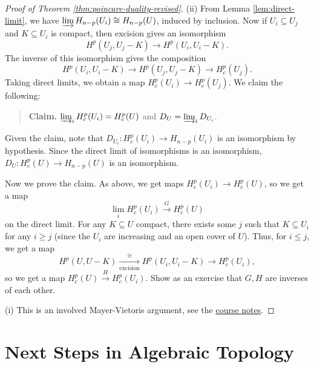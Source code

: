 \begin{proof}[Proof of Theorem \ref{thm:poincare-duality-revised}]
  (ii) From Lemma \ref{lem:direct-limit},
  we have $\varinjlim H_{n - p}(U_i) \cong H_{n - p}(U)$, induced by inclusion.
  Now if $U_i \subseteq U_j$ and
  $K \subseteq U_i$ is compact, then
  excision gives an isomorphism
  \[H^p(U_j, U_j - K) \longrightarrow H^p(U_i, U_i - K).\]
  The inverse of this isomorphism
  gives the composition
  \[
    H^p(U_i, U_i - K) \longrightarrow H^p(U_j, U_j - K) \longrightarrow H^p_c(U_j).
  \]
  Taking direct limits, we obtain a map
  $H^p_c(U_i) \to H^p_c(U_j)$. We claim
  the following:
  \begin{quote}
    \textbf{Claim.}
      $\varinjlim_i H^p_c(U_i) = H^p_c(U)$
      and $D_U = \varinjlim_i D_{U_i}$.
  \end{quote}
  Given the claim, note that
  $D_{U_i} : H^p_c(U_i) \to H_{n - p}(U_i)$
  is an isomorphism by hypothesis. Since
  the direct limit of isomorphisms is
  an isomorphism, $D_U : H^p_c(U) \to H_{n - p}(U)$
  is an isomorphism.

  Now we prove the claim. As above, we get
  maps $H^p_c(U_i) \to H^p_c(U)$, so we
  get a map
  \[
    \lim_i H^p_c(U_i) \overset{G}\longrightarrow H^p_c(U)
  \]
  on the direct limit. For any
  $K \subseteq U$ compact, there exists
  some $j$ such that $K \subseteq U_i$
  for any $i \ge j$ (since the $U_i$ are
  increasing and an open cover of $U$).
  Thus, for $i \le j$, we get a map
  \[
    H^p(U, U - K) \underset{\text{excision}}{\overset{\cong}{\longrightarrow}} H^p(U_i, U_i - K)
    \longrightarrow H^p_c(U_i),
  \]
  so we get a map $H^p_c(U) \overset{H}{\longrightarrow} H^p_c(U_i)$.
  Show as an exercise that $G, H$ are
  inverses of each other.

  (i) This is an involved Mayer-Vietoris
  argument,
  see the \href{https://etnyre.math.gatech.edu/class/6441Spring21/SectionIV.pdf}{course notes}.
\end{proof}

\section{Next Steps in Algebraic Topology}

